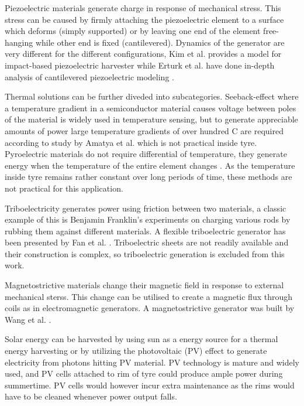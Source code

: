 Piezoelectric materials generate charge in response of mechanical stress. This stress can be caused by firmly attaching the piezoelectric element to a surface which deforms (simply supported) or by leaving one end of the element free-hanging while other end is fixed (cantilevered). Dynamics of the generator are very different for the different configurations, Kim et al. \cite{Kim2014a} provides a model for impact-based piezoelectric harvester while Erturk et al. have done in-depth analysis of cantilevered piezoelectric modeling \cite{Erturk2009}. 

Thermal solutions can be further diveded into subcategories. Seeback-effect where a temperature gradient in a semiconductor material causes voltage between poles of the material is widely used in temperature sensing, but to generate appreciable amounts of power large temperature gradients of over hundred \degree C are required according to study by Amatya et al. \cite{Amatya2010} which is not practical inside tyre. Pyroelectric materials do not require differential of temperature, they generate energy when the temperature of the entire element changes \cite{Zhang2011}. As the temperature inside tyre remains rather constant over long periods of time, these methods are not practical for this application.

Triboelectricity generates power using friction between two materials, a classic example of this is Benjamin Franklin's experiments on charging various rods by rubbing them against different materials. A flexible triboelectric generator has been presented by Fan et al. \cite{Fan2012}. Triboelectric sheets are not readily available and their construction is complex, so triboelectric generation is excluded from this work. 

Magnetostrictive materials change their magnetic field in response to external mechanical sterss. This change can be utilised to create a magnetic flux through coils as in electromagnetic generators. A magnetostrictive generator was built by Wang et al. \cite{Wang2006}. 

Solar energy can be harvested by using sun as a energy source for a thermal energy harvesting or by utilizing the photovoltaic (PV) effect to generate electricity from photons hitting PV material. PV technology is mature and widely used, and PV cells attached to rim of tyre could produce ample power during summertime. PV cells would however incur extra maintenance as the rims would have to be cleaned whenever power output falls. 

